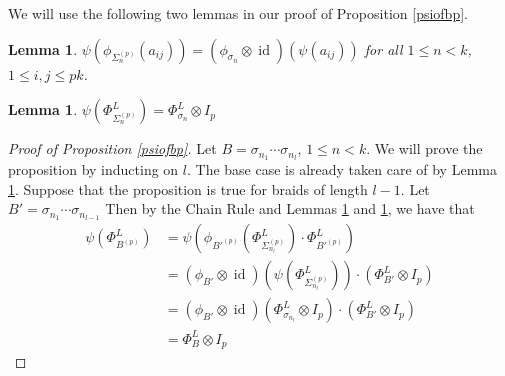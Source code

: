 \documentclass[11pt]{amsart}
\def\s{{\sigma}}
\newcommand\id{\operatorname{id}}
\newcommand\Sp{\Sigma^{(p)}}
\newtheorem{lem}[thm]{Lemma}
\newtheorem{prop}[thm]{Proposition}
\begin{document}


\noindent We will use the following two lemmas in our proof of Proposition \ref{psiofbp}.



\begin{lem}\label{commutes}
$\psi(\phi_{\Sp_n}(a_{ij})) = (\phi_{\s_n} \otimes \id)(\psi(a_{ij}))$ for all $1\le n < k$, $1 \le i,j \le pk$.
\end{lem}

\begin{lem}\label{basecase}
$\psi\left(\Phi_{\Sp_n}^L\right) = \Phi_{\s_n}^L\otimes I_p$
\end{lem}



\begin{proof} [Proof of Proposition \ref{psiofbp}]
Let $B = \s_{n_1}\cdots\s_{n_l}$, $1\le n<k$.  We will prove the proposition by inducting on $l$.  The base case is already taken care of by Lemma \ref{basecase}.  Suppose that the proposition is true for braids of length $l-1$.  Let $B' =\s_{n_1}\cdots\s_{n_{l-1}}$ Then by the Chain Rule and Lemmas \ref{commutes} and \ref{basecase}, we have that
\begin{align*}
\psi\left(\Phi_{B^{(p)}}^L\right) &= \psi\left(\phi_{B'^{(p)}}\left(\Phi_{\Sp_{n_l}}^L\right)\cdot\Phi_{B'^{(p)}}^L\right)\\
&= \left(\phi_{B'}\otimes\id\right)\left(\psi\left(\Phi_{\Sp_{n_l}}^L\right)\right)\cdot \left(\Phi_{B'}^L\otimes I_p\right)\\
&= \left(\phi_{B'}\otimes\id\right)\left(\Phi_{\s_{n_l}}^L\otimes I_p\right)\cdot \left(\Phi_{B'}^L\otimes I_p\right)\\
&= \Phi_B^L\otimes I_p
\end{align*}
\end{proof}
\end{document}
